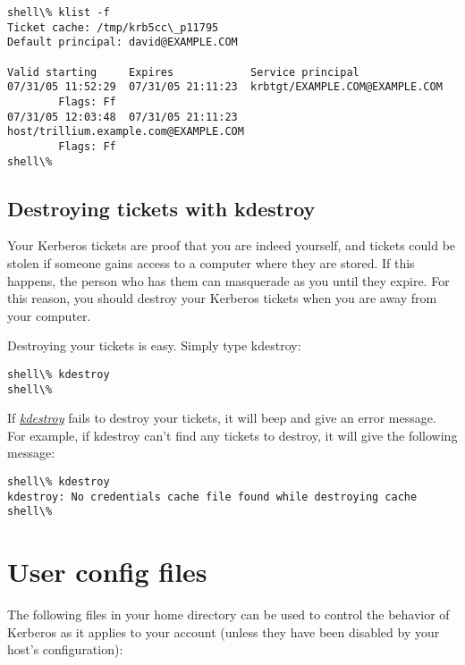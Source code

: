 \documentclass[letterpaper,10pt,english]{sphinxmanual}
\begin{document}
\begin{Verbatim}[commandchars=\\\{\}]
shell\% klist -f
Ticket cache: /tmp/krb5cc\_p11795
Default principal: david@EXAMPLE.COM

Valid starting     Expires            Service principal
07/31/05 11:52:29  07/31/05 21:11:23  krbtgt/EXAMPLE.COM@EXAMPLE.COM
        Flags: Ff
07/31/05 12:03:48  07/31/05 21:11:23  host/trillium.example.com@EXAMPLE.COM
        Flags: Ff
shell\%
\end{Verbatim}


\section{Destroying tickets with kdestroy}
\label{user/tkt_mgmt:destroying-tickets-with-kdestroy}
Your Kerberos tickets are proof that you are indeed yourself, and
tickets could be stolen if someone gains access to a computer where
they are stored.  If this happens, the person who has them can
masquerade as you until they expire.  For this reason, you should
destroy your Kerberos tickets when you are away from your computer.

Destroying your tickets is easy.  Simply type kdestroy:

\begin{Verbatim}[commandchars=\\\{\}]
shell\% kdestroy
shell\%
\end{Verbatim}

If {\hyperref[user/user_commands/kdestroy:kdestroy-1]{\emph{kdestroy}}} fails to destroy your tickets, it will beep and
give an error message.  For example, if kdestroy can't find any
tickets to destroy, it will give the following message:

\begin{Verbatim}[commandchars=\\\{\}]
shell\% kdestroy
kdestroy: No credentials cache file found while destroying cache
shell\%
\end{Verbatim}


\chapter{User config files}
\label{user/user_config/index::doc}\label{user/user_config/index:user-config-files}
The following files in your home directory can be used to control the
behavior of Kerberos as it applies to your account (unless they have
been disabled by your host's configuration):
\end{document}
